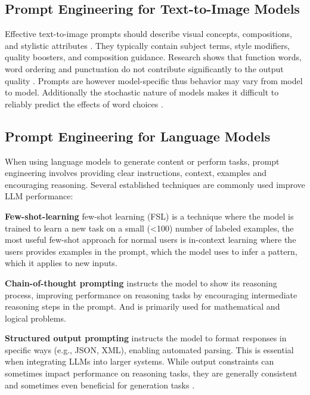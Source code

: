 \documentclass[
  a4paper,  %
  twoside,  %
  bibliography=totoc,
  headsepline,
  cleardoublepage=empty,
  parskip=half,
  draft=false
]{scrbook}
\begin{document}
\subsection{Prompt Engineering for Text-to-Image Models}

Effective text-to-image prompts should describe visual concepts, compositions, and stylistic attributes \cite{oppenlaender2023taxonomy,liu2022design}. They typically contain subject terms, style modifiers, quality boosters, and composition guidance. Research shows that function words, word ordering and punctuation do not contribute significantly to the output quality \cite{liu2022design}. Prompts are however model-specific thus behavior may vary from model to model. Additionally the stochastic nature of models makes it difficult to reliably predict the effects of word choices \cite{liu2022design,hao2022optimizing}.

\subsection{Prompt Engineering for Language Models}

When using language models to generate content or perform tasks, prompt engineering involves providing clear instructions, context, examples and encouraging reasoning. Several established techniques are commonly used improve LLM performance:

\textbf{Few-shot-learning} \cite{few-shot} few-shot learning (FSL) is a technique where the model is trained to learn a new task on a small (<100) number of labeled examples, the most useful few-shot approach for normal users is in-context learning \cite{in-context-learning} where the users provides examples in the prompt, which the model uses to infer a pattern,  which it applies to new inputs.

\textbf{Chain-of-thought prompting} \cite{chain-of-thought} instructs the model to show its reasoning process, improving performance on reasoning tasks by encouraging intermediate reasoning steps in the prompt. And is primarily used for mathematical and logical problems.

\textbf{Structured output prompting} instructs the model to format responses in specific ways (e.g., JSON, XML), enabling automated parsing. This is essential when integrating LLMs into larger systems. While output constraints can sometimes impact performance on reasoning tasks, they are generally consistent and sometimes even beneficial for generation tasks \cite{tam2024letspeakfreelystudy}.
\end{document}
